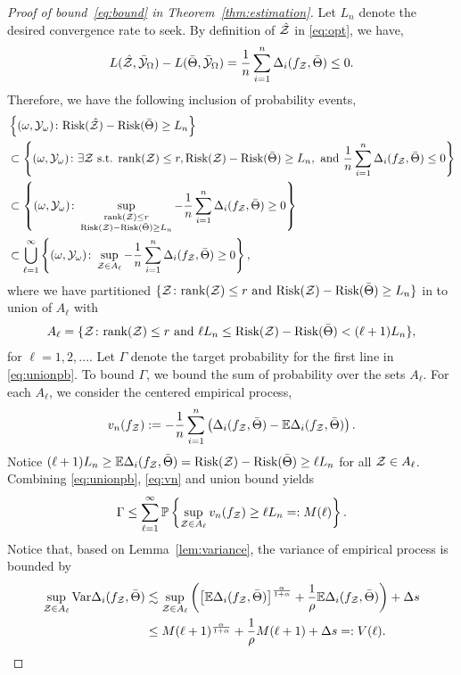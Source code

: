\documentclass[twoside,11pt]{article}
\theoremstyle{definition}
\def\risk{\textup{Risk}}
\begin{document}
\begin{proof}[Proof of bound~\eqref{eq:bound} in Theorem~\ref{thm:estimation}]
Let $L_n$ denote the desired convergence rate to seek. By definition of $\hat {\mathcal{Z}}$ in \eqref{eq:opt}, we have, 
\[ L(\hat {\mathcal{Z}},\bar {\mathcal{Y}}_\Omega)-L(\bar \Theta,\bar {\mathcal{Y}}_\Omega) = \frac{1}{n}\sum_{i=1}^n\Delta_i(f_{\mathcal{Z}},\bar \Theta)\leq 0.\]
Therefore, we have the following inclusion of probability events,
\begin{align}\label{eq:unionpb}
&\left\{(\omega,\tY_{\omega})\colon \risk(\hat \tZ)-\risk(\bar\Theta)\geq L_n \right\}\nonumber\\
&\subset\left\{(\omega,\tY_{\omega})\colon\exists \tZ \text{ s.t. } \text{rank}(\tZ)\leq r,  \risk(\tZ)-\risk(\bar\Theta)\geq L_n, \text{ and } \frac{1}{n}\sum_{i=1}^n\Delta_i(f_\tZ,\bar \Theta)\leq 0 \right\}\nonumber\\
&\subset \left\{(\omega,\tY_{\omega})\colon\sup_{\substack{\text{rank}(\tZ)\leq r\\  
\risk(\tZ)-\risk(\bar\Theta)\geq L_n  }}-\frac{1}{n}\sum_{i=1}^n\Delta_i(f_\tZ,\bar \Theta)\geq 0\right\}\nonumber\\
&\subset \bigcup_{\ell=1}^{\infty}\left\{(\omega,\tY_\omega)\colon \sup_{\tZ\in A_{\ell}}-\frac{1}{n}\sum_{i=1}^n\Delta_i(f_\tZ,\bar \Theta)\geq 0\right\},
\end{align}
where we have partitioned $\{\tZ\colon \text{rank}(\tZ)\leq r \text{ and } \risk(\tZ)-\risk(\bar\Theta)\geq L_n\}$ in to union of $A_{\ell}$ with 
\begin{align}
A_{\ell} = \{\tZ\colon \text{rank}(\tZ)\leq r \text{ and } \ell L_n\leq  \risk(\tZ)-\risk(\bar\Theta)<(\ell+1)L_n\},
\end{align}
for $\ell = 1,2,\ldots$. Let $\Gamma$ denote the target probability for the first line in \eqref{eq:unionpb}. To bound $\Gamma$, we bound the sum of probability over the sets $A_{\ell}$.   For each $A_{\ell}$, we consider the centered empirical process,
\begin{align}\label{eq:vn}
v_n(f_{\mathcal{Z}}) := -\frac{1}{n}\sum_{i=1}^n \left(\Delta_i(f_{\mathcal{Z}},\bar \Theta)- \mathbb{E}\Delta_i(f_{\mathcal{Z}},\bar \Theta)\right).
\end{align}
Notice $(\ell+1)L_n\geq \mathbb{E}\Delta_i(f_\tZ,\bar \Theta) =\risk	(\tZ)-\risk(\bar\Theta)\geq \ell L_n$ for all $\mathcal{Z}\in A_{\ell}$.  Combining \eqref{eq:unionpb},  \eqref{eq:vn} and union bound yields
\begin{align}\label{eq:gammabd}
\Gamma\leq \sum_{\ell=1}^\infty\mathbb{P}\left\{\sup_{\mathcal{Z}\in A_{\ell}} v_n(f_{\mathcal{Z}})\geq  \ell L_n=:M(\ell) \right\}.
\end{align}
Notice that, based on Lemma~\ref{lem:variance}, the variance of empirical process is bounded by 
\begin{align}
\sup_{\mathcal{Z}\in A_{\ell}}\textup{Var}\Delta_i(f_{\mathcal{Z}},\bar \Theta)& \lesssim \sup_{\mathcal{Z}\in A_{\ell}}\left( \left[\mathbb{E}\Delta_i(f_{\mathcal{Z}},\bar \Theta)\right]^{\alpha \over 1+\alpha}+{1\over \rho}\mathbb{E}\Delta_i(f_{\mathcal{Z}},\bar \Theta)\right)+\Delta s \\&\leq M(\ell+1)^{\alpha\over 1+\alpha}+\frac{1}{\rho}M(\ell+1) +\Delta s =: V(\ell).
\end{align}


\end{proof}
\end{document}
